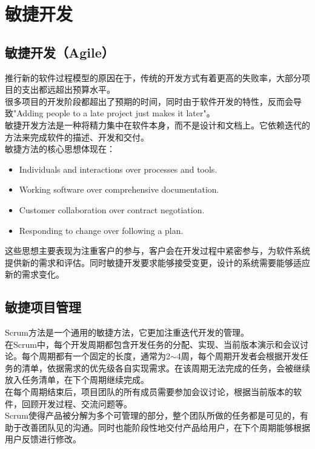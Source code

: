 \newpage

\section{敏捷开发}

\subsection{敏捷开发（Agile）}

推行新的软件过程模型的原因在于，传统的开发方式有着更高的失败率，大部分项目的支出都远超出预算水平。\\

很多项目的开发阶段都超出了预期的时间，同时由于软件开发的特性，反而会导致"Adding people to a late project just makes it later"。\\

敏捷开发方法是一种将精力集中在软件本身，而不是设计和文档上。它依赖迭代的方法来完成软件的描述、开发和交付。\\

敏捷方法的核心思想体现在：

\begin{itemize}
    \item Individuals and interactions over processes and tools.
    \item Working software over comprehensive documentation.
    \item Customer collaboration over contract negotiation.
    \item Responding to change over following a plan.
\end{itemize}

这些思想主要表现为注重客户的参与，客户会在开发过程中紧密参与，为软件系统提供新的需求和评估。同时敏捷开发要求能够接受变更，设计的系统需要能够适应新的需求变化。\\

\subsection{敏捷项目管理}

Scrum方法是一个通用的敏捷方法，它更加注重迭代开发的管理。\\

在Scrum中，每个开发周期都包含开发任务的分配、实现、当前版本演示和会议讨论。每个周期都有一个固定的长度，通常为2$ \sim $4周，每个周期开发者会根据开发任务的清单，依据需求的优先级各自实现需求。在该周期无法完成的任务，会被继续放入任务清单，在下个周期继续完成。\\

在每个周期结束后，项目团队的所有成员需要参加会议讨论，根据当前版本的软件，回顾开发过程、交流问题等。\\

Scrum使得产品被分解为多个可管理的部分，整个团队所做的任务都是可见的，有助于改善团队见的沟通。同时也能阶段性地交付产品给用户，在下个周期能够根据用户反馈进行修改。

\newpage